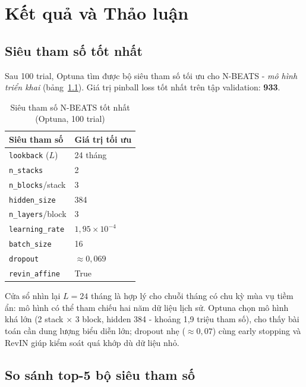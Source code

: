 \documentclass[12pt, a4paper]{report}
\begin{document}
\chapter{Kết quả và Thảo luận}

\section{Siêu tham số tốt nhất}
\label{sec:best_params}

Sau 100 trial, Optuna tìm được bộ siêu tham số tối ưu cho N-BEATS - \textit{mô hình triển khai} (bảng~\ref{tab:best_params}). Giá trị pinball loss tốt nhất trên tập validation: \textbf{933}.

\begin{table}[H]
\centering
\caption{Siêu tham số N-BEATS tốt nhất (Optuna, 100 trial)}
\label{tab:best_params}
\begin{tabular}{|l|l|}
\hline
Siêu tham số & Giá trị tối ưu \\
\hline
\texttt{lookback} ($L$)     & 24 tháng \\
\texttt{n\_stacks}           & 2 \\
\texttt{n\_blocks}/stack     & 3 \\
\texttt{hidden\_size}        & 384 \\
\texttt{n\_layers}/block     & 3 \\
\texttt{learning\_rate}      & $1{,}95 \times 10^{-4}$ \\
\texttt{batch\_size}         & 16 \\
\texttt{dropout}             & $\approx 0{,}069$ \\
\texttt{revin\_affine}       & True \\
\hline
\end{tabular}
\end{table}

Cửa sổ nhìn lại $L=24$ tháng là hợp lý cho chuỗi tháng có chu kỳ mùa vụ tiềm ẩn: mô hình có thể tham chiếu hai năm dữ liệu lịch sử. Optuna chọn mô hình khá lớn (2 stack $\times$ 3 block, hidden 384 - khoảng 1,9 triệu tham số), cho thấy bài toán cần dung lượng biểu diễn lớn; dropout nhẹ ($\approx 0{,}07$) cùng early stopping và RevIN giúp kiểm soát quá khớp dù dữ liệu nhỏ.

\section{So sánh top-5 bộ siêu tham số}
\label{sec:top5}
\end{document}
